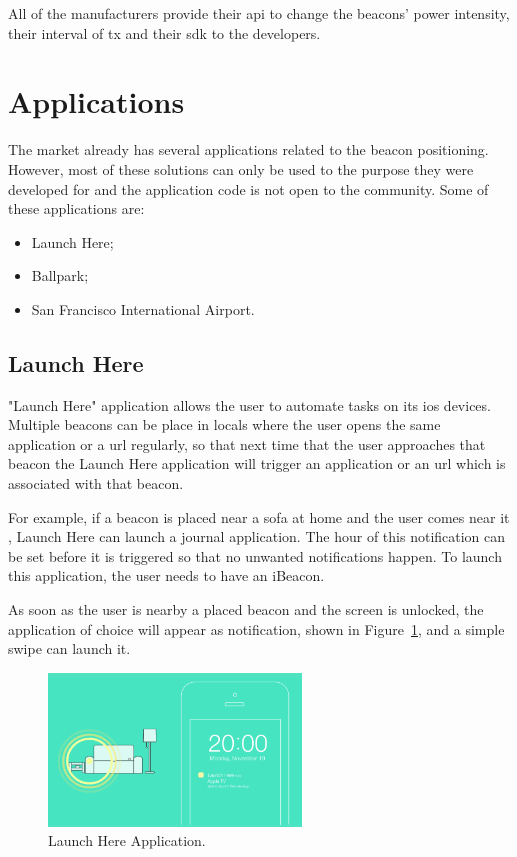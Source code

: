 All of the manufacturers provide their \gls{api} to change the beacons' power intensity, their interval of \gls{tx} and their \gls{sdk} to the developers.

\section{Applications}
\label{section:aplications}

The market already has several applications related to the beacon positioning. However, most of these solutions can only be used to the purpose they were developed for and the application code is not open to the community. Some of these applications are:
\begin{itemize}
\item Launch Here;
\item Ballpark;
\item San Francisco International Airport.
\end{itemize}

\subsection{Launch Here}
\label{subsection:launchhere}
"Launch Here" application allows the user to automate tasks on its \gls{ios} devices.
Multiple beacons can be place in locals where the user opens the same application or a \gls{url} regularly, so that next time that the user approaches that beacon the Launch Here application will trigger an application or an \gls{url} which is associated with that beacon.

For example, if a beacon is placed near a sofa at home and the user comes near it , Launch Here can launch a journal application. The hour of this notification can be set before it is triggered so that no unwanted notifications happen.
To launch this application, the user needs to have an iBeacon.

As soon as the user is nearby a placed beacon and the screen is unlocked, the application of choice will appear as notification, shown in Figure~\ref{fig:lauchhereapp}, and a simple swipe can launch it.

\begin{figure}[!htb]
  \centering
  \includegraphics[width=0.6\textwidth]{Figures/launchhere_data.png}
  \caption[Lauch Here Application]{Launch Here Application.}
  \label{fig:lauchhereapp}
\end{figure}


